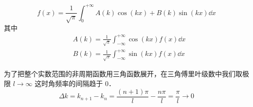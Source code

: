 
\begin{issues}
\issueDraft
\end{issues}

\begin{equation}
f(x) = \frac{1}{\sqrt{\pi}}\int_0^{+\infty} A(k) \cos(kx) + B(k)\sin(kx) \dd{x}
\end{equation}
其中
\begin{align}
&A(k) = \frac{1}{\sqrt{\pi}}\int_{-\infty}^{+\infty} \cos(kx) f(x) \dd{x}\\
&B(k) = \frac{1}{\sqrt{\pi}}\int_{-\infty}^{+\infty} \sin(kx) f(x) \dd{x}
\end{align}


为了把整个实数范围的非周期函数用三角函数展开，在三角傅里叶级数中我们取极限 $l\to\infty$ 这时角频率的间隔趋于 0．
\begin{equation}
\Delta k = k_{n+1} - k_n = \frac{(n+1)\pi}{l} - \frac{n\pi}{l} = \frac{\pi}{l} \to 0
\end{equation}
